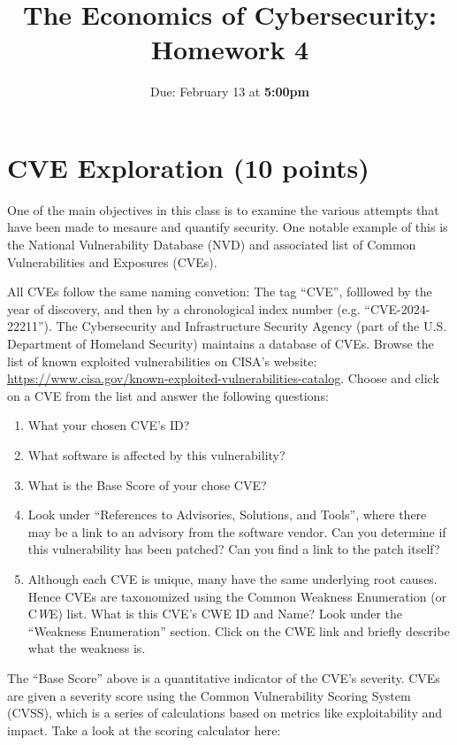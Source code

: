 \documentclass[11pt]{article}
\title{The Economics of Cybersecurity: Homework 4}
\date{Due: February 13 at {\bf 5:00pm}}
\author{}
\begin{document}
\maketitle

\section*{CVE Exploration (10 points)}


One of the main objectives in this class is to examine the various attempts that have been made to mesaure and quantify security. 
One notable example of this is the National Vulnerability Database (NVD) and associated list of Common Vulnerabilities and Exposures (CVEs).


All CVEs follow the same naming convetion: The tag ``CVE'', folllowed by the year of discovery, and then by a chronological index number (e.g. ``CVE-2024-22211''). The Cybersecurity and Infrastructure Security Agency (part of the U.S. Department of Homeland Security) maintains a database of CVEs. Browse the list of known exploited vulnerabilities on CISA's website: \href{https://www.cisa.gov/known-exploited-vulnerabilities-catalog}{https://www.cisa.gov/known-exploited-vulnerabilities-catalog}. 
Choose and click on a CVE from the list and answer the following questions:

\begin{enumerate}
    \item What your chosen CVE's ID?
    \item What software is affected by this vulnerability?
    \item What is the Base Score of your chose CVE?
    \item Look under ``References to Advisories, Solutions, and Tools'', where there may be a link to an advisory from the software vendor. Can you determine if this vulnerability has been patched? Can you find a link to the patch itself? 
    \item Although each CVE is unique, many have the same underlying root causes. Hence CVEs are taxonomized using the Common Weakness Enumeration (or C\textit{W}E) list. What is this CVE's CWE ID and Name? Look under the ``Weakness Enumeration'' section. Click on the CWE link and briefly describe what the weakness is.
\end{enumerate}

The ``Base Score'' above is a quantitative indicator of the CVE's severity. CVEs are given a severity score using the Common Vulnerability Scoring System (CVSS), which is a series of calculations based on metrics like exploitability and impact. Take a look at the scoring calculator here: 
\end{document}
